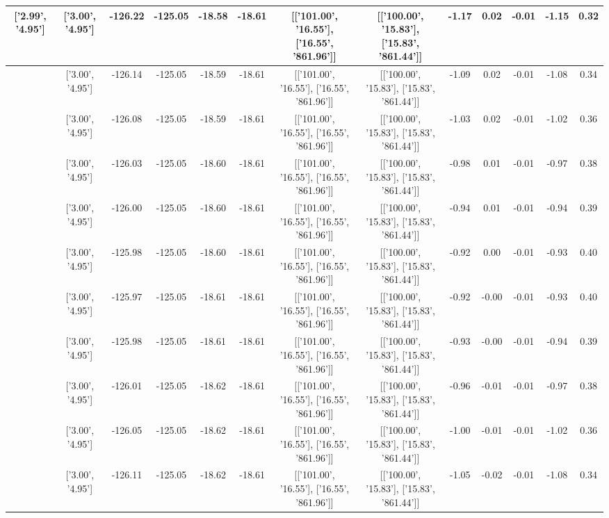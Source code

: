 \begin{table}[htbp]
\begin{adjustbox}{angle=90}
\begin{tabular}{|c|c|c|c|c|c|c|c|c|c|c|c|c|}
 ['2.99', '4.95'] & ['3.00', '4.95'] & -126.22 & -125.05 & -18.58 & -18.61 & [['101.00', '16.55'], ['16.55', '861.96']] & [['100.00', '15.83'], ['15.83', '861.44']] & -1.17 & 0.02 & -0.01 & -1.15 & 0.32\\ \hline
 ['2.99', '4.95'] & ['3.00', '4.95'] & -126.14 & -125.05 & -18.59 & -18.61 & [['101.00', '16.55'], ['16.55', '861.96']] & [['100.00', '15.83'], ['15.83', '861.44']] & -1.09 & 0.02 & -0.01 & -1.08 & 0.34\\ \hline
 ['3.00', '4.95'] & ['3.00', '4.95'] & -126.08 & -125.05 & -18.59 & -18.61 & [['101.00', '16.55'], ['16.55', '861.96']] & [['100.00', '15.83'], ['15.83', '861.44']] & -1.03 & 0.02 & -0.01 & -1.02 & 0.36\\ \hline
 ['3.00', '4.95'] & ['3.00', '4.95'] & -126.03 & -125.05 & -18.60 & -18.61 & [['101.00', '16.55'], ['16.55', '861.96']] & [['100.00', '15.83'], ['15.83', '861.44']] & -0.98 & 0.01 & -0.01 & -0.97 & 0.38\\ \hline
 ['3.00', '4.95'] & ['3.00', '4.95'] & -126.00 & -125.05 & -18.60 & -18.61 & [['101.00', '16.55'], ['16.55', '861.96']] & [['100.00', '15.83'], ['15.83', '861.44']] & -0.94 & 0.01 & -0.01 & -0.94 & 0.39\\ \hline
 ['3.00', '4.95'] & ['3.00', '4.95'] & -125.98 & -125.05 & -18.60 & -18.61 & [['101.00', '16.55'], ['16.55', '861.96']] & [['100.00', '15.83'], ['15.83', '861.44']] & -0.92 & 0.00 & -0.01 & -0.93 & 0.40\\ \hline
 ['3.00', '4.95'] & ['3.00', '4.95'] & -125.97 & -125.05 & -18.61 & -18.61 & [['101.00', '16.55'], ['16.55', '861.96']] & [['100.00', '15.83'], ['15.83', '861.44']] & -0.92 & -0.00 & -0.01 & -0.93 & 0.40\\ \hline
 ['3.00', '4.95'] & ['3.00', '4.95'] & -125.98 & -125.05 & -18.61 & -18.61 & [['101.00', '16.55'], ['16.55', '861.96']] & [['100.00', '15.83'], ['15.83', '861.44']] & -0.93 & -0.00 & -0.01 & -0.94 & 0.39\\ \hline
 ['3.00', '4.95'] & ['3.00', '4.95'] & -126.01 & -125.05 & -18.62 & -18.61 & [['101.00', '16.55'], ['16.55', '861.96']] & [['100.00', '15.83'], ['15.83', '861.44']] & -0.96 & -0.01 & -0.01 & -0.97 & 0.38\\ \hline
 ['3.00', '4.95'] & ['3.00', '4.95'] & -126.05 & -125.05 & -18.62 & -18.61 & [['101.00', '16.55'], ['16.55', '861.96']] & [['100.00', '15.83'], ['15.83', '861.44']] & -1.00 & -0.01 & -0.01 & -1.02 & 0.36\\ \hline
 ['3.00', '4.95'] & ['3.00', '4.95'] & -126.11 & -125.05 & -18.62 & -18.61 & [['101.00', '16.55'], ['16.55', '861.96']] & [['100.00', '15.83'], ['15.83', '861.44']] & -1.05 & -0.02 & -0.01 & -1.08 & 0.34\\ \hline

\end{tabular}
\end{adjustbox}
\end{table}
